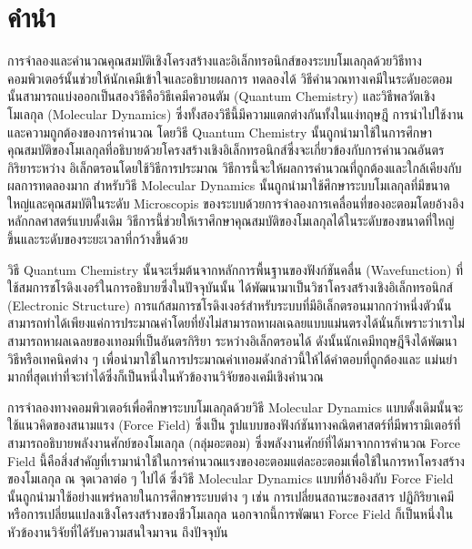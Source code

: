 

{

\chapter*{\centering คำนำ}

การจำลองและคำนวณคุณสมบัติเชิงโครงสร้างและอิเล็กทรอนิกส์ของระบบโมเลกุลด้วยวิธีทางคอมพิวเตอร์นั้นช่วยให้นักเคมีเข้าใจและอธิบายผลการ%
ทดลองได้ วิธีคำนวณทางเคมีในระดับอะตอมนั้นสามารถแบ่งออกเป็นสองวิธีคือวิธีเคมีควอนตัม (Quantum Chemistry) และวิธีพลวัตเชิงโมเลกุล 
(Molecular Dynamics) ซึ่งทั้งสองวิธีนี้มีความแตกต่างกันทั้งในแง่ทฤษฎี การนำไปใช้งานและความถูกต้องของการคำนวณ โดยวิธี Quantum 
Chemistry นั้นถูกนำมาใช้ในการศึกษาคุณสมบัติของโมเลกุลที่อธิบายด้วยโครงสร้างเชิงอิเล็กทรอนิกส์ซึ่งจะเกี่ยวข้องกับการคำนวณอันตรกิริยาระหว่าง%
อิเล็กตรอนโดยใช้วิธีการประมาณ วิธีการนี้จะให้ผลการคำนวณที่ถูกต้องและใกล้เคียงกับผลการทดลองมาก สำหรับวิธี Molecular Dynamics 
นั้นถูกนำมาใช้ศึกษาระบบโมเลกุลที่มีขนาดใหญ่และคุณสมบัติในระดับ Microscopis ของระบบด้วยการจำลองการเคลื่อนที่ของอะตอมโดยอ้างอิง%
หลักกลศาสตร์แบบดั้งเดิม วิธีการนี้ช่วยให้เราศึกษาคุณสมบัติของโมเลกุลได้ในระดับของขนาดที่ใหญ่ขึ้นและระดับของระยะเวลาที่กว้างขึ้นด้วย

วิธี Quantum Chemistry นั้นจะเริ่มต้นจากหลักการพื้นฐานของฟังก์ชันคลื่น (Wavefunction) ที่ใช้สมการชโรดิงเงอร์ในการอธิบายซึ่งในปัจจุบันนั้น%
ได้พัฒนามาเป็นวิชาโครงสร้างเชิงอิเล็กทรอนิกส์ (Electronic Structure) การแก้สมการชโรดิงเงอร์สำหรับระบบที่มีอิเล็กตรอนมากกว่าหนึ่งตัวนั้น%
สามารถทำได้เพียงแค่การประมาณค่าโดยที่ยังไม่สามารถหาผลเฉลยแบบแม่นตรงได้นั่นก็เพราะว่าเราไม่สามารถหาผลเฉลยของเทอมที่เป็นอันตรกิริยา%
ระหว่างอิเล็กตรอนได้ ดังนั้นนักเคมีทฤษฎีจึงได้พัฒนาวิธีหรือเทคนิคต่าง ๆ เพื่อนำมาใช้ในการประมาณค่าเทอมดังกล่าวนี้ให้ได้คำตอบที่ถูกต้องและ%
แม่นยำมากที่สุดเท่าที่จะทำได้ซึ่งก็เป็นหนึ่งในหัวข้องานวิจัยของเคมีเชิงคำนวณ

การจำลองทางคอมพิวเตอร์เพื่อศึกษาระบบโมเลกุลด้วยวิธี Molecular Dynamics แบบดั้งเดิมนั้นจะใช้แนวคิดของสนามแรง (Force Field) ซึ่งเป็น%
รูปแบบของฟังก์ชันทางคณิตศาสตร์ที่มีพารามิเตอร์ที่สามารถอธิบายพลังงานศักย์ของโมเลกุล (กลุ่มอะตอม) ซึ่งพลังงานศักย์ที่ได้มาจากการคำนวณ Force 
Field นี้คือสิ่งสำคัญที่เรามานำใช้ในการคำนวณแรงของอะตอมแต่ละอะตอมเพื่อใช้ในการหาโครงสร้างของโมเลกุล ณ จุดเวลาต่อ ๆ ไปได้ ซึ่งวิธี 
Molecular Dynamics แบบที่อ้างอิงกับ Force Field นั้นถูกนำมาใช้อย่างแพร่หลายในการศึกษาระบบต่าง ๆ เช่น การเปลี่ยนสถานะของสสาร 
ปฏิกิริยาเคมีหรือการเปลี่ยนแปลงเชิงโครงสร้างของชีวโมเลกุล นอกจากนี้การพัฒนา Force Field ก็เป็นหนึ่งในหัวข้องานวิจัยที่ได้รับความสนใจมาจน%
ถึงปัจจุบัน

}
